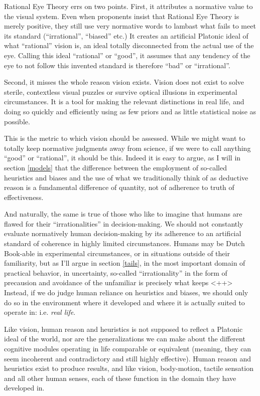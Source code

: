 \documentclass{article}
\begin{document}
Rational Eye Theory errs on two points.
First, it attributes a normative value to the visual system.
Even when proponents insist that Rational Eye Theory is merely positive, they still use very normative words to lambast what fails to meet its standard (``irrational'', ``biased'' etc.)
It creates an artificial Platonic ideal of what ``rational'' vision is, an ideal totally disconnected from the actual use of the eye.
Calling this ideal ``rational'' or ``good'', it assumes that any tendency of the eye to not follow this invented standard is therefore ``bad'' or ``irrational''.

Second, it misses the whole reason vision exists.
Vision does not exist to solve sterile, contextless visual puzzles or survive optical illusions in experimental circumstances.
It is a tool for making the relevant distinctions in real life, and doing so quickly and efficiently using as few priors and as little statistical noise as possible.

This is the metric to which vision should be assessed.
While we might want to totally keep normative judgments away from science, if we were to call anything ``good'' or ``rational'', it should be this.
Indeed it is easy to argue, as I will in section \ref{models} that the difference between the employment of so-called heuristics and biases and the use of what we traditionally think of as deductive reason is a fundamental difference of quantity, not of adherence to truth of effectiveness.

And naturally, the same is true of those who like to imagine that humans are flawed for their ``irrationalities'' in decision-making.
We should not constantly evaluate normatively human decision-making by its adherence to an artificial standard of coherence in highly limited circumstances.
Humans may be Dutch Book-able in experimental circumstances, or in situations outside of their familiarity, but as I'll argue in section \ref{tails}, in the most important domain of practical behavior, in uncertainty, so-called ``irrationality'' in the form of precausion and avoidance of the unfamiliar is precisely what keeps
<++>
Instead, if we do judge human reliance on heuristics and biases, we should only do so in the environment where it developed and where it is actually suited to operate in: i.e. \emph{real life}.

Like vision, human reason and heuristics is not supposed to reflect a Platonic ideal of the world, nor are the generalizations we can make about the different cognitive modules operating in life comparable or equivalent (meaning, they can seem incoherent and contradictory and still highly effective).
Human reason and heuristics exist to produce results, and like vision, body-motion, tactile sensation and all other human senses, each of these function in the domain they have developed in.
\end{document}

